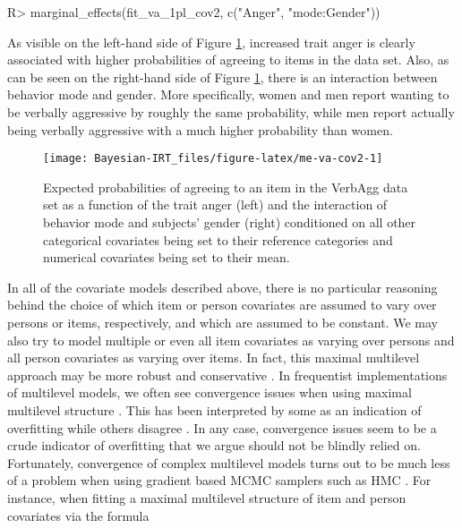 \documentclass[jss]{jss}
\begin{document}
\begin{CodeChunk}

\begin{CodeInput}
R> marginal_effects(fit_va_1pl_cov2, c("Anger", "mode:Gender"))
\end{CodeInput}
\end{CodeChunk}

As visible on the left-hand side of Figure \ref{fig:me-va-cov2},
increased trait anger is clearly associated with higher probabilities of
agreeing to items in the  data set. Also, as can be seen
on the right-hand side of Figure \ref{fig:me-va-cov2}, there is an
interaction between behavior mode and gender. More specifically, women
and men report wanting to be verbally aggressive by roughly the same
probability, while men report actually being verbally aggressive with a
much higher probability than women.

\begin{CodeChunk}
\begin{figure}

{\centering \texttt{[image: Bayesian-IRT\_files/figure-latex/me-va-cov2-1]} 

}

\caption[Expected probabilities of agreeing to an item in the VerbAgg data set as a function of the trait anger (left) and the interaction of behavior mode and subjects' gender (right) conditioned on all other categorical covariates being set to their reference categories and numerical covariates being set to their mean]{Expected probabilities of agreeing to an item in the VerbAgg data set as a function of the trait anger (left) and the interaction of behavior mode and subjects' gender (right) conditioned on all other categorical covariates being set to their reference categories and numerical covariates being set to their mean.}\label{fig:me-va-cov2}
\end{figure}
\end{CodeChunk}

In all of the covariate models described above, there is no particular
reasoning behind the choice of which item or person covariates are
assumed to vary over persons or items, respectively, and which are
assumed to be constant. We may also try to model multiple or even all
item covariates as varying over persons and all person covariates as
varying over items. In fact, this maximal multilevel approach may be
more robust and conservative \citep{barr2013}. In frequentist
implementations of multilevel models, we often see convergence issues
when using maximal multilevel structure \citep{bates2015}. This has been
interpreted by some as an indication of overfitting \citep{bates2015}
while others disagree \citep{barr2013}. In any case, convergence issues
seem to be a crude indicator of overfitting that we argue should not be
blindly relied on. Fortunately, convergence of complex multilevel models
turns out to be much less of a problem when using gradient based MCMC
samplers such as HMC \citep{hoffman2014}. For instance, when fitting a
maximal multilevel structure of item and person covariates via the
formula
\end{document}
